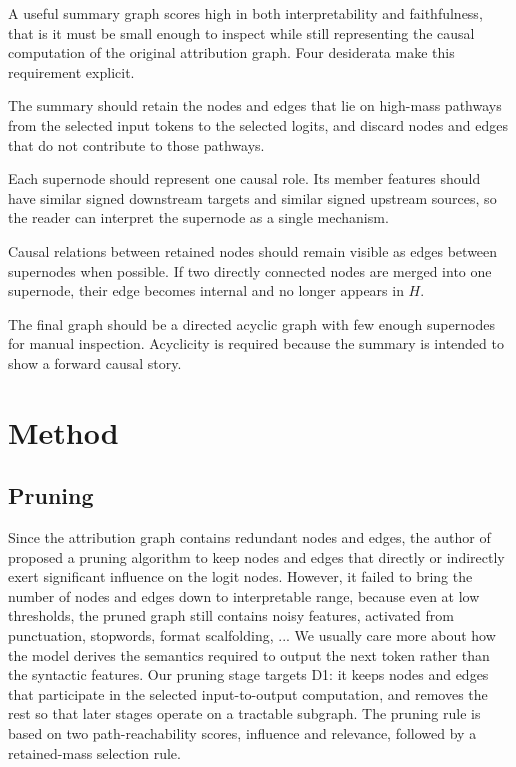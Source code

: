 \documentclass[../main.tex]{subfiles}
\begin{document}
A useful summary graph scores high in both interpretability and faithfulness, that is it must be small enough to inspect while still representing
the causal computation of the original attribution graph. Four desiderata make
this requirement explicit.
\begin{description}[leftmargin=2.0em,style=nextline,topsep=2pt,itemsep=3pt]
\item[(D1) Importance retention.] The summary should retain the nodes and edges
that lie on high-mass pathways from the selected input tokens to the selected
logits, and discard nodes and edges that do not contribute to those pathways.
\item[(D2) Atomicity.] Each supernode should represent one causal role. Its
member features should have similar signed downstream targets and similar signed
upstream sources, so the reader can interpret the supernode as a single
mechanism.
\item[(D3) Causal-information preservation.] Causal relations between retained
nodes should remain visible as edges between supernodes when possible. If two
directly connected nodes are merged into one supernode, their edge becomes
internal and no longer appears in $H$.
\item[(D4) Interpretability.] The final graph should be a directed acyclic graph
with few enough supernodes for manual inspection. Acyclicity is required because
the summary is intended to show a forward causal story.
\end{description}

\section{Method}
\label{sec:method}
\subsection{Pruning}
\label{sec:stage1}
Since the attribution graph contains redundant nodes and edges, the author of \cite{ameisen2025circuit} proposed a pruning algorithm to keep nodes and edges that directly or indirectly exert significant influence on the logit nodes. However, it failed to bring the number of nodes and edges down to interpretable range, because even at low thresholds, the pruned graph still contains noisy features, activated from punctuation, stopwords, format scalfolding, ... We usually care more about how the model derives the semantics required to output the next token rather than the syntactic features. Our pruning stage targets D1:
it keeps nodes and edges that participate in the selected input-to-output
computation, and removes the rest so that later stages operate on a tractable
subgraph. The pruning rule is based on two path-reachability scores, influence and
relevance, followed by a retained-mass selection rule.
\end{document}
